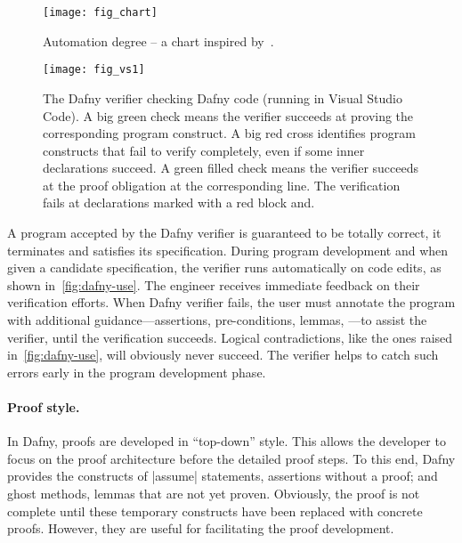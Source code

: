 \begin{figure}[ht]
\centering
\texttt{[image: fig\_chart]}
\caption[Automation degree chart]{Automation degree -- a chart inspired by~\cite{leino2010b}.}
\label{fig:dafny-auto}
\end{figure}

\begin{figure}[p]
\begin{center}
\texttt{[image: fig\_vs1]}
\end{center}
\caption[Dafny running in Visual Studio Code]{
The Dafny verifier checking Dafny code (running in Visual Studio Code).
A big green check{ }{ }\circledb[dafnyok]{\faCheck}{ }means the verifier succeeds at proving the corresponding program construct.
A big red cross{ }{ }\circledb[dafnyno]{\scalebox{1.25}{\faTimes}}{ }identifies program constructs that fail to verify completely, even if some inner declarations succeed.
A green filled check {\color{dafnyok}{\scalebox{.8}{\faCheckCircle}}} means the verifier succeeds at the proof obligation at the corresponding line.
The verification fails at declarations marked with a red block  and\;\;.
}\label{fig:dafny-use}
\end{figure}

A program accepted by the Dafny verifier is guaranteed to be totally correct, \ie it terminates and satisfies its specification.
During program development and when given a candidate specification, the verifier runs automatically on code edits, as shown in~\autoref{fig:dafny-use}.
The engineer receives immediate feedback on their verification efforts.
When Dafny verifier fails, the user must annotate the program with additional guidance---assertions, pre-conditions, lemmas, \etc---to assist the verifier, until the verification succeeds.
Logical contradictions, like the ones raised in~\autoref{fig:dafny-use}, will obviously never succeed.
The verifier helps to catch such errors early in the program development phase.

\paragraph*{Proof style.}
In Dafny, proofs are developed in \enquote{top-down} style.
This allows the developer to focus on the proof architecture before the detailed proof steps.
To this end, Dafny provides the constructs of \pr|assume| statements, \ie assertions without a proof;
and ghost methods, \ie lemmas that are not yet proven.
Obviously, the proof is not complete until these temporary constructs have been replaced with concrete proofs.
However, they are useful for facilitating the proof development.


